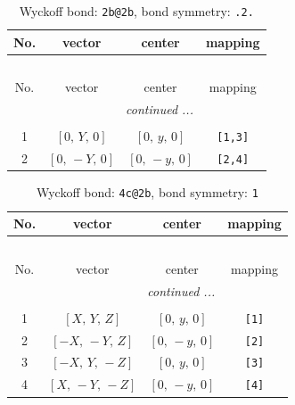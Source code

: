 \documentclass[fleqn,8pt]{jsarticle}
\begin{document}
\renewcommand{\arraystretch}{1.2}
\begin{longtable}{cccc}
\caption{Wyckoff bond: {\tt 2b@2b}, bond symmetry: {\tt .2.}}
 \\
 \hline \hline
No. & vector & center & mapping \\ \hline \endfirsthead

\multicolumn{3}{l}{\tablename\ \thetable{}} \\
 \hline \hline
No. & vector & center & mapping \\ \hline \endhead

 \hline \hline
\multicolumn{3}{r}{\footnotesize\it continued ...} \\ \endfoot

 \hline \hline
\multicolumn{3}{r}{} \\ \endlastfoot

1 & $\left[ 0,\, Y,\, 0 \right]$ & $\left[ 0,\, y,\, 0 \right]$ & {\tt [1,3]} \\ \hline
2 & $\left[ 0,\, - Y,\, 0 \right]$ & $\left[ 0,\, - y,\, 0 \right]$ & {\tt [2,4]} \\
\end{longtable}
\renewcommand{\arraystretch}{1.2}
\begin{longtable}{cccc}
\caption{Wyckoff bond: {\tt 4c@2b}, bond symmetry: {\tt 1}}
 \\
 \hline \hline
No. & vector & center & mapping \\ \hline \endfirsthead

\multicolumn{3}{l}{\tablename\ \thetable{}} \\
 \hline \hline
No. & vector & center & mapping \\ \hline \endhead

 \hline \hline
\multicolumn{3}{r}{\footnotesize\it continued ...} \\ \endfoot

 \hline \hline
\multicolumn{3}{r}{} \\ \endlastfoot

1 & $\left[ X,\, Y,\, Z \right]$ & $\left[ 0,\, y,\, 0 \right]$ & {\tt [1]} \\ \hline
2 & $\left[ - X,\, - Y,\, Z \right]$ & $\left[ 0,\, - y,\, 0 \right]$ & {\tt [2]} \\ \hline
3 & $\left[ - X,\, Y,\, - Z \right]$ & $\left[ 0,\, y,\, 0 \right]$ & {\tt [3]} \\ \hline
4 & $\left[ X,\, - Y,\, - Z \right]$ & $\left[ 0,\, - y,\, 0 \right]$ & {\tt [4]} \\
\end{longtable}
\end{document}
